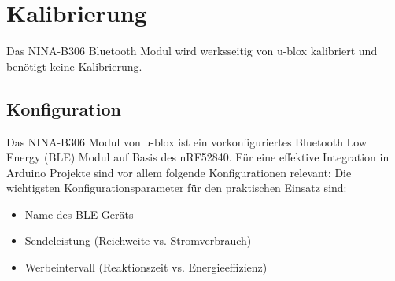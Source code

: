 \begin{center}
\end{center}


\section{Kalibrierung}
Das NINA-B306 Bluetooth Modul wird werksseitig von u-blox kalibriert und benötigt keine Kalibrierung.\cite{ublox:2017}

\subsection{Konfiguration}
Das NINA-B306 Modul von u-blox ist ein vorkonfiguriertes Bluetooth Low Energy (BLE) Modul auf Basis des nRF52840. Für eine effektive Integration in Arduino Projekte sind vor allem folgende Konfigurationen relevant:
Die wichtigsten Konfigurationsparameter für den praktischen Einsatz sind:
\begin{itemize}
	\item Name des BLE Geräts
	\item Sendeleistung (Reichweite vs. Stromverbrauch)
	\item Werbeintervall (Reaktionszeit vs. Energieeffizienz)
\end{itemize}

